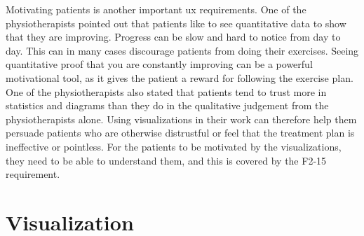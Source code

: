Motivating patients is another important \gls{ux} requirements. One of the physiotherapists pointed out that patients like to see quantitative data to show that they are improving. Progress can be slow and hard to notice from day to day. This can in many cases discourage patients from doing their exercises. Seeing quantitative proof that you are constantly improving can be a powerful motivational tool, as it gives the patient a reward for following the exercise plan. One of the physiotherapists also stated that patients tend to trust more in statistics and diagrams than they do in the qualitative judgement from the physiotherapists alone. Using visualizations in their work can therefore help them persuade patients who are otherwise distrustful or feel that the treatment plan is ineffective or pointless. For the patients to be motivated by the visualizations, they need to be able to understand them, and this is covered by the F2-15 requirement. 

\section{Visualization}
